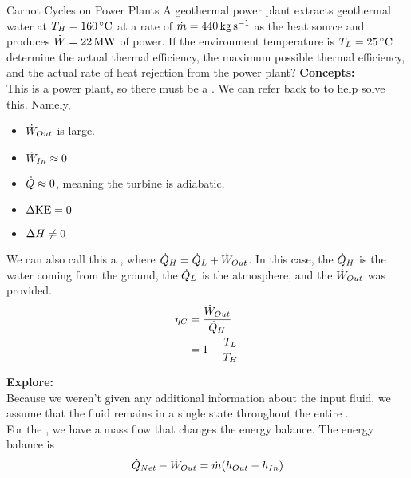 \begin{example}{Carnot Cycles on Power Plants}
  A geothermal power plant extracts geothermal water at $\Temp_{H} = \SI{160}{\degreeCelsius}$ at a rate of $\dot{m} = \SI{440}{\kilo\gram\per\second}$ as the heat source and produces $\dot{W} = \SI{22}{\mega\watt}$ of power.
  If the environment temperature is $\Temp_{L} = \SI{25}{\degreeCelsius}$ determine the actual thermal efficiency, the maximum possible thermal efficiency, and the actual rate of heat rejection from the power plant?
  \tcblower{}
  \textbf{Concepts:} \\
  This is a power plant, so there must be a .
  We can refer back to  to help solve this.
  Namely,
  \begin{itemize}[noitemsep]
  \item $\dot{W}_{Out}$ is large.
  \item $\dot{W}_{In} \approx 0$
  \item $\dot{Q} \approx 0$, meaning the turbine is adiabatic.
  \item $\Delta \mathrm{KE} = 0$
  \item $\Delta H \neq 0$
  \end{itemize}

  We can also call this a , where $\dot{Q}_{H} = \dot{Q}_{L} + \dot{W}_{Out}$.
  In this case, the $\dot{Q}_{H}$ is the water coming from the ground, the $\dot{Q}_{L}$ is the atmosphere, and the $\dot{W}_{Out}$ was provided. \\
  \begin{equation*}
    \begin{aligned}
      \eta_{C} &= \frac{\dot{W}_{Out}}{\dot{Q}_{H}} \\
      &= 1 - \frac{T_{L}}{T_{H}}
    \end{aligned}
  \end{equation*}

  \textbf{Explore:} \\
  Because we weren't given any additional information about the input fluid, we assume that the fluid remains in a single state throughout the entire . \\
  For the , we have a mass flow that changes the energy balance.
  The energy balance is
  \begin{equation*}
    \dot{Q}_{Net} - \dot{W}_{Out} = \dot{m} (h_{Out} - h_{In})
  \end{equation*}


\end{example}
